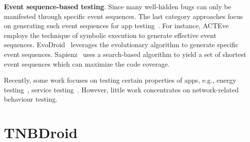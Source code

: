 \documentclass[sigconf,review, anonymous]{acmart}
\begin{document}
\textbf{Event sequence-based testing}. Since many well-hidden bugs can only be manifested through specific event sequences. The last category approaches focus on generating such event sequences for app testing~\cite{AnandNHY12,JensenPM13,EvoDroid,MaoHJ16}. For instance,  \textsf{ACTEve}~\cite{AnandNHY12} employs the technique of symbolic execution to generate effective event sequences. 
\textsf{EvoDroid}~\cite{EvoDroid} leverages the evolutionary algorithm to generate specific event sequences. \textsf{Sapienz}~\cite{MaoHJ16} uses a search-based algorithm to yield a set of shortest event sequences which can maximize the code coverage.

Recently, some work focuses on testing certain properties of apps, e.g., energy testing~\cite{BehrouzSBM16,BanerjeeCBR18,JabbarvandLM19}, service testing~\cite{ZhangLLC17,ma2018}. However, little work concentrates on network-related behaviour testing. 


\section{TNBDroid}\label{approach}
\end{document}
